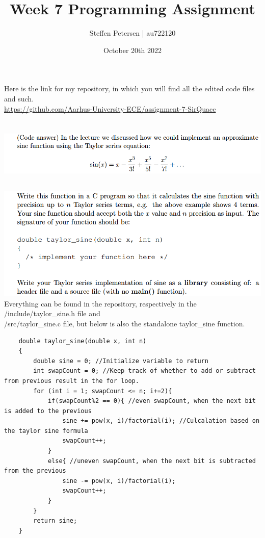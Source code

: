 \documentclass{article}
\title{Week 7 Programming Assignment}
\author{Steffen Petersen | au722120}
\date{October 20th 2022}
\begin{document}

\maketitle
\vspace{5pt}
\noindent Here is the link for my repository, in which you will find all the edited code files and such.\\
\url{https://github.com/Aarhus-University-ECE/assignment-7-SirQuacc}
\section{}
\includegraphics[width=\linewidth, keepaspectratio=true]{task1}
\subsection{}
\includegraphics[width=\linewidth, keepaspectratio=true]{task1a}
Everything can be found in the repository, respectively in the /include/taylor\_sine.h file and \\/src/taylor\_sine.c file, but below is also
the standalone taylor\_sine function.

\begin{lstlisting}
    double taylor_sine(double x, int n)
    {
        double sine = 0; //Initialize variable to return
        int swapCount = 0; //Keep track of whether to add or subtract from previous result in the for loop.
        for (int i = 1; swapCount <= n; i+=2){
            if(swapCount%2 == 0){ //even swapCount, when the next bit is added to the previous
                sine += pow(x, i)/factorial(i); //Culcalation based on the taylor sine formula
                swapCount++;
            }
            else{ //uneven swapCount, when the next bit is subtracted from the previous
                sine -= pow(x, i)/factorial(i);
                swapCount++;
            }
        }
        return sine;
    }
\end{lstlisting}
\end{document}
